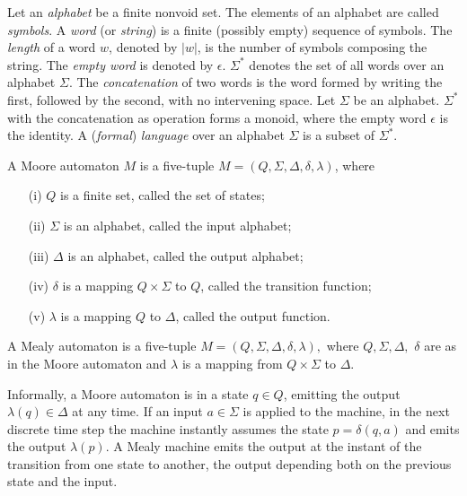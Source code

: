 Let an {\em alphabet} be a finite nonvoid set.
The elements of an alphabet are called {\em symbols}.
A {\em word} (or {\em string}) is a finite (possibly empty) sequence of
symbols.
The {\em length} of a word $w$, denoted by $|w|$, is the number of symbols
composing the string.
The {\em empty word} is denoted by $\epsilon$.
$\Sigma^*$ denotes the set of all words over an alphabet $\Sigma$.
The {\em concatenation} of two words is the word formed by writing
the first, followed by the second, with no intervening space.
Let $\Sigma$ be an alphabet.
$\Sigma^*$ with the concatenation as operation forms a monoid,
where the empty word $\epsilon$ is the identity.
A ({\em formal}) {\em language} over an alphabet $\Sigma$ is a
subset of $\Sigma^*$.

\begin{definition}
\label{moore}
A Moore automaton $M$ is a five-tuple
$M=(Q,\Sigma,\Delta,\delta,\lambda)$, where
\begin{enumerate}
\item[{\rm (i)}] $Q$ is a finite set, called the set of states;\vspace{-2mm}

\item[{\rm (ii)}]  $\Sigma$ is an alphabet, called the input
alphabet;\vspace{-2mm}

\item[{\rm (iii)}] $\Delta$ is an alphabet, called the output alphabet;
\vspace{-2mm}
\item[{\rm (iv)}]  $\delta$ is a mapping $Q \times \Sigma$ to $Q$,
called the transition function;
\vspace{-2mm}
\item[{\rm (v)}] $\lambda$ is a mapping $Q$ to $\Delta$, called the output function.
\end{enumerate}
\end{definition}
\begin{definition}
A Mealy automaton is a five-tuple $M=(Q,\Sigma,\Delta,\delta,\lambda),$
where $Q,\Sigma,\Delta,$ $\delta$ are as in the Moore automaton and
$\lambda$ is a mapping from $Q \times \Sigma$ to $\Delta$.
\end{definition}

Informally, a Moore automaton is in a state $q \in Q$,
emitting the output $\lambda(q) \in \Delta$ at any time.
If an input $a \in \Sigma$ is applied to the machine,
in the next discrete time step
the machine instantly assumes the state $p = \delta(q,a)$ and emits
the output $\lambda(p)$.
A Mealy machine emits the output at the instant of the transition
from one state to another, the output depending both on the previous
state and the input.

